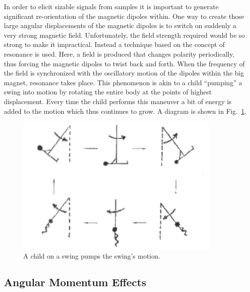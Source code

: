 In order to elicit sizable signals from samples it is important to generate significant re-orientation of the magnetic dipoles within. One way to create those large angular displacements of the magnetic dipoles is to switch on suddenly a very strong magnetic field. Unfortunately, the field strength required would be so strong to make it impractical. Instead a technique based on the concept of resonance is used. Here, a field is produced that changes polarity periodically, thus forcing the magnetic dipoles to twist back and forth. When the frequency of the field is synchronized with the oscillatory motion of the dipoles within the big magnet, resonance takes place. This phenomenon is akin to a child ``pumping'' a swing into motion by rotating the entire body at the points of highest displacement. Every time the child performs this maneuver a bit of energy is added to the motion which thus continues to grow. A diagram is shown in Fig.~\ref{Fig9-15}. 
 \begin{figure}[h]
	\centering
	\includegraphics[width=4.0in]{./figures/Topic9/Fig9-15.png}
	\caption{A child on a swing pumps the swing's motion.}
 	\label{Fig9-15}
\end{figure} 

\subsection{Angular Momentum Effects}

